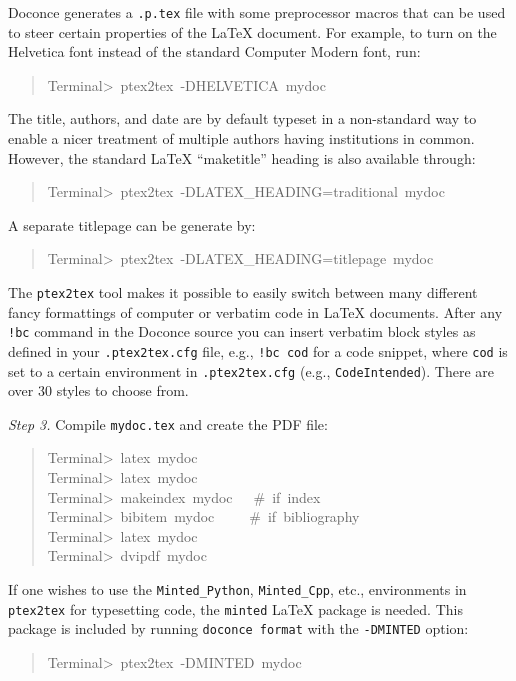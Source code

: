 \documentclass[a4paper]{article}
\begin{document}
Doconce generates a \texttt{.p.tex} file with some preprocessor macros
that can be used to steer certain properties of the LaTeX document.
For example, to turn on the Helvetica font instead of the standard
Computer Modern font, run:
%
\begin{quote}{\ttfamily \raggedright \noindent
Terminal>~ptex2tex~-DHELVETICA~mydoc
}
\end{quote}

The title, authors, and date are by default typeset in a non-standard
way to enable a nicer treatment of multiple authors having
institutions in common. However, the standard LaTeX ``maketitle'' heading
is also available through:
%
\begin{quote}{\ttfamily \raggedright \noindent
Terminal>~ptex2tex~-DLATEX\_HEADING=traditional~mydoc
}
\end{quote}

A separate titlepage can be generate by:
%
\begin{quote}{\ttfamily \raggedright \noindent
Terminal>~ptex2tex~-DLATEX\_HEADING=titlepage~mydoc
}
\end{quote}

The \texttt{ptex2tex} tool makes it possible to easily switch between many
different fancy formattings of computer or verbatim code in LaTeX
documents. After any \texttt{!bc} command in the Doconce source you can
insert verbatim block styles as defined in your \texttt{.ptex2tex.cfg}
file, e.g., \texttt{!bc cod} for a code snippet, where \texttt{cod} is set to
a certain environment in \texttt{.ptex2tex.cfg} (e.g., \texttt{CodeIntended}).
There are over 30 styles to choose from.

\emph{Step 3.} Compile \texttt{mydoc.tex}
and create the PDF file:
%
\begin{quote}{\ttfamily \raggedright \noindent
Terminal>~latex~mydoc\\
Terminal>~latex~mydoc\\
Terminal>~makeindex~mydoc~~~\#~if~index\\
Terminal>~bibitem~mydoc~~~~~\#~if~bibliography\\
Terminal>~latex~mydoc\\
Terminal>~dvipdf~mydoc
}
\end{quote}

If one wishes to use the \texttt{Minted\_Python}, \texttt{Minted\_Cpp}, etc., environments
in \texttt{ptex2tex} for typesetting code, the \texttt{minted} LaTeX package is needed.
This package is included by running \texttt{doconce format} with the
\texttt{-DMINTED} option:
%
\begin{quote}{\ttfamily \raggedright \noindent
Terminal>~ptex2tex~-DMINTED~mydoc
}
\end{quote}
\end{document}
